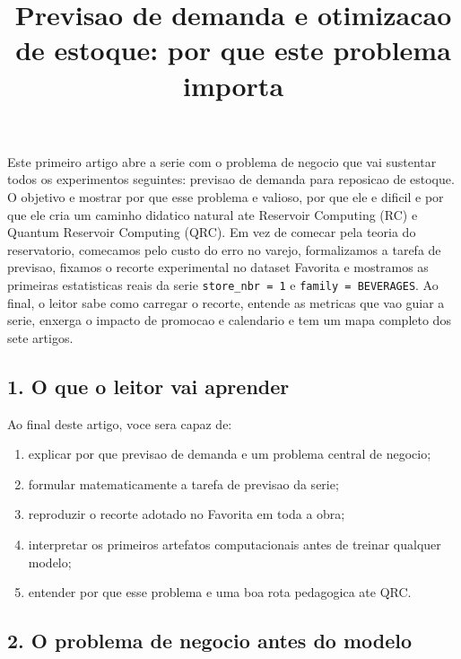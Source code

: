\documentclass[12pt]{article}
\title{Previsao de demanda e otimizacao de estoque: por que este problema importa}
\author{}
\providecommand{\tightlist}{%
          \setlength{\itemsep}{0pt}\setlength{\parskip}{0pt}}
\begin{document}
        \maketitle

        \begin{resumo}
        Este primeiro artigo abre a serie com o problema de negocio que vai sustentar todos os experimentos seguintes: previsao de demanda para reposicao de estoque. O objetivo e mostrar por que esse problema e valioso, por que ele e dificil e por que ele cria um caminho didatico natural ate Reservoir Computing (RC) e Quantum Reservoir Computing (QRC). Em vez de comecar pela teoria do reservatorio, comecamos pelo custo do erro no varejo, formalizamos a tarefa de previsao, fixamos o recorte experimental no dataset Favorita e mostramos as primeiras estatisticas reais da serie \texttt{store\_nbr\ =\ 1} e \texttt{family\ =\ BEVERAGES}. Ao final, o leitor sabe como carregar o recorte, entende as metricas que vao guiar a serie, enxerga o impacto de promocao e calendario e tem um mapa completo dos sete artigos.
        \end{resumo}

        \subsection{1. O que o leitor vai aprender}\label{1-o-que-o-leitor-vai-aprender}

Ao final deste artigo, voce sera capaz de:

\begin{enumerate}
\def\labelenumi{\arabic{enumi}.}
\tightlist
\item
  explicar por que previsao de demanda e um problema central de negocio;
\item
  formular matematicamente a tarefa de previsao da serie;
\item
  reproduzir o recorte adotado no Favorita em toda a obra;
\item
  interpretar os primeiros artefatos computacionais antes de treinar qualquer modelo;
\item
  entender por que esse problema e uma boa rota pedagogica ate QRC.
\end{enumerate}

\subsection{2. O problema de negocio antes do modelo}\label{2-o-problema-de-negocio-antes-do-modelo}
\end{document}
